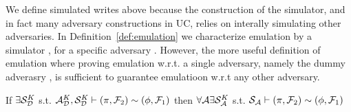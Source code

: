 We define simulated writes above because the construction of the simulator, and in fact many adversary constructions in UC, relies on interally simulating other adversaries.
In Definition~\ref{def:emulation} we characterize emulation by a simulator \Simulator, for a specific adversary \Adversary.
However, the more useful definition of emulation where proving emulation w.r.t. a single adversary, namely the dummy adverasry \DummyAdv, is sufficient to guarantee emulatioon w.r.t any other adversary.

\begin{theorem}\label{thm:dummy}
If $\exists \mathcal{S}_{\mathcal{D}}^{K}$ s.t. $ \mathcal{A}_\mathcal{D}^K, \mathcal{S}_{\mathcal{D}}^K \vdash (\pi, \mathcal{F}_2) \sim (\phi, \mathcal{F}_1)$ then $\forall \mathcal{A} \exists \mathcal{S}_\mathcal{A}^K$ s.t. $\mathcal{S}_{\mathcal{A}} \vdash  (\pi, \mathcal{F}_2) \sim (\phi, \mathcal{F}_1)$ 
\end{theorem}

